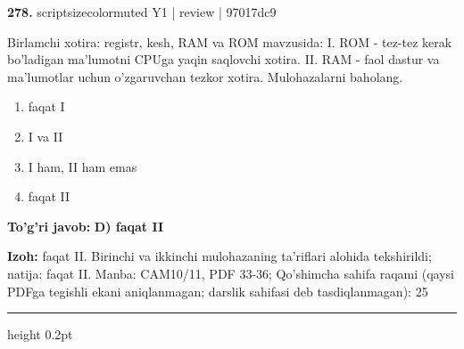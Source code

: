 \documentclass[10pt,a4paper]{article}
\begin{document}
{\bfseries\sffamily\color{ink} 278.} {scriptsizecolor{muted} Y1 | review | 97017dc9}
\par
Birlamchi xotira: registr, kesh, RAM va ROM mavzusida: I. ROM - tez-tez kerak bo'ladigan ma'lumotni CPUga yaqin saqlovchi xotira. II. RAM - faol dastur va ma'lumotlar uchun o'zgaruvchan tezkor xotira. Mulohazalarni baholang.
\begin{enumerate}[label=\Alph*),leftmargin=9mm]
\item faqat I
\item I va II
\item I ham, II ham emas
\item faqat II
\end{enumerate}
\begin{tcolorbox}[enhanced,breakable,colback=teal!4,colframe=teal!60!black,boxrule=0.45pt,arc=1.2mm,left=2.7mm,right=2.7mm,top=1.8mm,bottom=1.8mm,before skip=2mm,after skip=2mm]
{\bfseries\sffamily\color{teal}To'g'ri javob:} \textbf{D) faqat II}
\par\smallskip
{\bfseries Izoh:} faqat II. Birinchi va ikkinchi mulohazaning ta'riflari alohida tekshirildi; natija: faqat II. Manba: CAM10/11, PDF 33-36; Qo'shimcha sahifa raqami (qaysi PDFga tegishli ekani aniqlanmagan; darslik sahifasi deb tasdiqlanmagan): 25
\end{tcolorbox}
\vspace{2mm}\hrule height 0.2pt\vspace{3mm}
\end{document}
